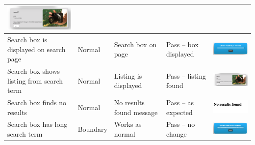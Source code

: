 \begin{center}
\begin{longtable}{|P{23mm}|P{20mm}|P{19mm}|P{20mm}|P{54mm}|}
\includegraphics[width=51mm]{ch4_testing_for_eval/media/image28.png} \\ \hline
Search box is displayed on search page & Normal & Search box on page &
Pass -- box displayed &
\includegraphics[width=51mm]{ch4_testing_for_eval/media/image29.png} \\ \hline
Search box shows listing from search term & Normal & Listing is
displayed & Pass -- listing found &
\includegraphics[width=51mm]{ch4_testing_for_eval/media/image28.png} \\ \hline
Search box finds no results & Normal & No results found message & Pass
-- as expected &
\includegraphics[width=51mm]{ch4_testing_for_eval/media/image30.png} \\ \hline
Search box has long search term & Boundary & Works as normal & Pass --
no change &
\includegraphics[width=51mm]{ch4_testing_for_eval/media/image31.png}


\end{longtable}
\end{center}
